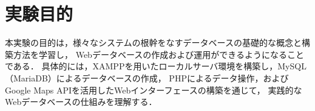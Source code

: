 \section*{実験目的}

本実験の目的は，様々なシステムの根幹をなすデータベースの基礎的な概念と構築方法を学習し，
Webデータベースの作成および運用ができるようになることである．
具体的には，XAMPPを用いたローカルサーバ環境を構築し，MySQL（MariaDB）によるデータベースの作成，
PHPによるデータ操作，およびGoogle Maps APIを活用したWebインターフェースの構築を通じて，
実践的なWebデータベースの仕組みを理解する．
